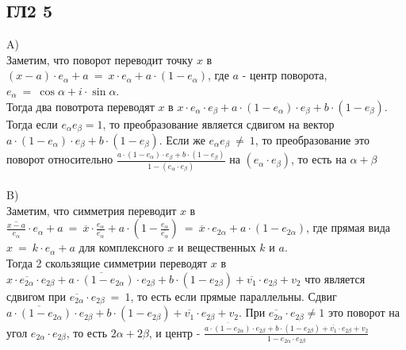 		\subsection{ГЛ2 5}	
		A)\\
		Заметим, что поворот переводит точку $x$ в $(x - a) \cdot e_\alpha + a \: = \: x \cdot e_\alpha + a \cdot (1 - e_\alpha)$, где $a$ - центр поворота, $e_\alpha \: = \: \cos\alpha + i \cdot \sin\alpha$. \\Тогда два повотрота переводят $x$ в $x \cdot e_\alpha \cdot e_\beta + a \cdot (1 - e_\alpha) \cdot e_\beta + b \cdot (1 - e_\beta)$. Тогда если $e_\alpha e_\beta = 1$, то преобразование является сдвигом на вектор $a \cdot (1 - e_\alpha) \cdot e_\beta + b \cdot (1 - e_\beta)$. Если же $e_\alpha e_\beta \: \ne \: 1$, то преобразование это поворот относительно $\frac{a \cdot (1 - e_\alpha) \cdot e_\beta + b \cdot (1 - e_\beta)}{1 - (e_\alpha \cdot e_\beta)}$ на $(e_\alpha \cdot e_\beta)$, то есть на $\alpha + \beta$
		\\ \\
		B)\\
		Заметим, что симметрия переводит $x$ в $\overline{\frac{x - a}{e_\alpha}} \cdot e_\alpha + a \: = \: \overline{x} \cdot \frac{e_\alpha}{\overline{e_\alpha}} + a \cdot (1 - \frac{e_\alpha}{\overline{e_\alpha}}) \: = \: \overline{x} \cdot e_{2\alpha} + a \cdot (1 - e_{2\alpha})$, где прямая вида $x \: = \: k \cdot e_\alpha + a$ для комплексного $x$ и вещественных $k$ и $a$.\\
		Тогда 2 скользящие симметрии переводят $x$ в $x \cdot \overline{e_{2\alpha}} \cdot e_{2\beta} + \overline{a \cdot (1 - e_{2\alpha})} \cdot e_{2\beta} + b \cdot (1 - e_{2\beta}) + \overline{v_1} \cdot e_{2\beta} + v_2$ что является сдвигом при $\overline{e_{2\alpha}} \cdot e_{2\beta} \: = \: 1$, то есть если прямые параллельны. Сдвиг $\overline{a \cdot (1 - e_{2\alpha})} \cdot e_{2\beta} + b \cdot (1 - e_{2\beta})+ \overline{v_1} \cdot e_{2\beta} + v_2$. При $\overline{e_{2\alpha}} \cdot e_{2\beta} \ne 1$ это поворот на угол $e_{2\alpha} \cdot e_{2\beta}$, то есть $2\alpha + 2\beta$, и центр - $\frac{\overline{a \cdot (1 - e_{2\alpha})} \cdot e_{2\beta} + b \cdot (1 - e_{2\beta})+ \overline{v_1} \cdot e_{2\beta} + v_2}{1 - e_{2\alpha} \cdot e_{2\beta}}$		
